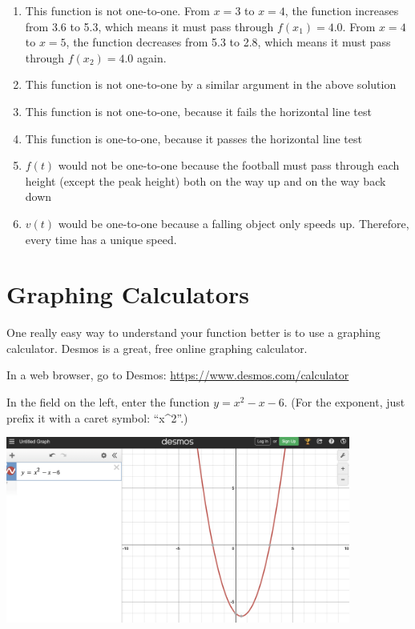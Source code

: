 \begin{Answer}[ref=invfunc1]
	\begin{enumerate}
	\item This function is not one-to-one. From $x=3$ to $x=4$, the 
	function increases from 3.6 to 5.3, which means it must pass through 
	$f(x_1)=4.0$. From $x=4$ to $x=5$, the function decreases from 5.3 to 
	2.8, which means it must pass through $f(x_2) = 4.0$ again. 
	\item This function is not one-to-one by a similar argument in the 
	above solution
	\item This function is not one-to-one, because it fails the horizontal 
	line test
	\item This function is one-to-one, because it passes the horizontal 
	line test
	\item $f(t)$ would not be one-to-one because the football must pass 
	through each height (except the peak height) both on the way up and 
	on the way back down
	\item $v(t)$ would be one-to-one because a falling object only speeds 
	up. Therefore, every time has a unique speed. 
	\end{enumerate}
\end{Answer}

\section{Graphing Calculators}

One really easy way to understand your function better is to use a graphing
calculator. Desmos is a great, free online graphing calculator. 

In a web browser, go to Desmos: \url{https://www.desmos.com/calculator}

In the field on the left, enter the function $y = x^2 - x - 6$. (For
the exponent, just prefix it with a caret symbol: ``x\^{}2''.)

\includegraphics[width=0.85\textwidth]{Desmos.png}


